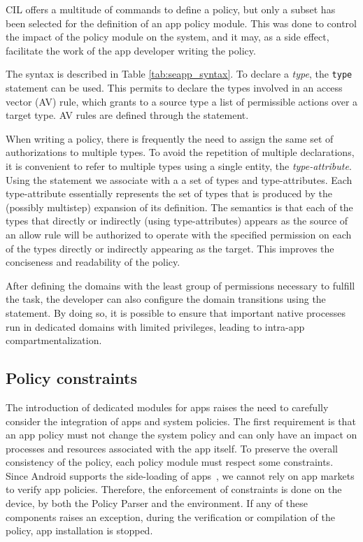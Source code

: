 
CIL offers a multitude of commands to define a policy, but only a
subset has been selected for the definition of an app policy module.
This was done to control the impact of the policy module on the system,
and it may, as a side effect, facilitate the work of the app developer
writing the policy.

The syntax is described in Table \ref{tab:seapp_syntax}.  To declare a
\emph{type}, the \texttt{type} statement can be used.  This permits to
declare the types involved in an access vector (AV) rule, which grants
to a source type a list of permissible actions over a target type.  AV
rules are defined through the \allow statement.

When writing a policy, there is frequently the need to assign the same
set of authorizations to multiple types.  To avoid the repetition of
multiple \allow declarations, it is convenient to refer to multiple
types using a single entity, the {\em type-attribute}.  Using the
\typeattributeset statement we associate with a \typeattribute a set
of types and type-attributes.  Each type-attribute essentially
represents the set of types that is produced by the (possibly
multistep) expansion of its definition.  The semantics is that each
of the types that directly or indirectly (using type-attributes)
appears as the source of an allow rule will be authorized to operate
with the specified permission on each of the types directly or
indirectly appearing as the target.  This improves the conciseness and
readability of the policy.

After defining the domains with the least group of permissions
necessary to fulfill the task, the developer can also configure the
domain transitions using the \typetransition statement.
By doing so, it is possible to ensure that important native processes run
in dedicated domains with limited privileges, leading to intra-app
compartmentalization.


\subsection{Policy constraints}\label{subsect:seapp_constraints}

The introduction of dedicated modules for apps raises the need to
carefully consider the integration of apps and system policies.  The
first requirement is that an app policy must not change the system
policy and can only have an impact on processes and resources
associated with the app itself.  To preserve the overall consistency
of the \sel policy, each policy module must respect some constraints.
Since Android supports the side-loading of
apps~\cite{seapp_adb_install}, we cannot rely on app markets to verify
app policies.  Therefore, the enforcement of constraints is done on
the device, by both the \seapp Policy Parser and the \sel environment.
If any of these components raises an exception, during the
verification or compilation of the policy, app installation is
stopped.

